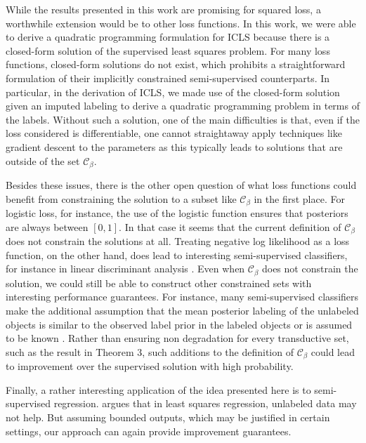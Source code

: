 \documentclass{llncs}
\newcommand{\Cb}{\mathcal{C}_{\beta}}
\begin{document}
While the results presented in this work are promising for squared loss, a worthwhile extension would be to other loss functions. In this work, we were able to derive a quadratic programming formulation for ICLS because there is a closed-form solution of the supervised least squares problem. For many loss functions, closed-form solutions do not exist, which prohibits a straightforward formulation of their implicitly constrained semi-supervised counterparts. In particular, in the derivation of ICLS, we made use of the closed-form solution given an imputed labeling to derive a quadratic programming problem in terms of the labels. Without such a solution, one of the main difficulties is that, even if the loss considered is differentiable, one cannot straightaway apply techniques like gradient descent to the parameters as this typically leads to solutions that are outside of the set $\Cb$. 

Besides these issues, there is the other open question of what loss functions could benefit from constraining the solution to a subset like $\Cb$ in the first place. For logistic loss, for instance, the use of the logistic function ensures that posteriors are always between $[0,1]$. In that case it seems that the current definition of $\Cb$ does not constrain the solutions at all. Treating negative log likelihood as a loss function, on the other hand, does lead to interesting semi-supervised classifiers, for instance in linear discriminant analysis \cite{Krijthe2014}. Even when $\Cb$ does not constrain the solution, we could still be able to construct other constrained sets with interesting performance guarantees. For instance, many semi-supervised classifiers make the additional assumption that the mean posterior labeling of the unlabeled objects is similar to the observed label prior in the labeled objects \cite{Joachims1999,Collobert2006} or is assumed to be known \cite{Mann2010}. Rather than ensuring non degradation for every transductive set, such as the result in Theorem 3, such additions to the definition of $\Cb$ could lead to improvement over the supervised solution with high probability.

Finally, a rather interesting application of the idea presented here is to semi-supervised regression. \cite{Culp2008} argues that in least squares regression, unlabeled data may not help. But assuming bounded outputs, which may be justified in certain settings, our approach can again provide improvement guarantees.
\end{document}
